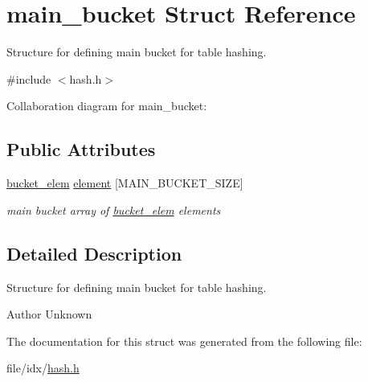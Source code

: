 \hypertarget{structmain__bucket}{\section{main\+\_\+bucket Struct Reference}
\label{structmain__bucket}
}


Structure for defining main bucket for table hashing.  




{\ttfamily \#include $<$hash.\+h$>$}



Collaboration diagram for main\+\_\+bucket\+:
\subsection*{Public Attributes}
\begin{DoxyCompactItemize}
\item 
\hypertarget{structmain__bucket_a9b8d4d8df358bb72c94902a6536a44aa}{\hyperlink{structbucket__elem}{bucket\+\_\+elem} \hyperlink{structmain__bucket_a9b8d4d8df358bb72c94902a6536a44aa}{element} \mbox{[}M\+A\+I\+N\+\_\+\+B\+U\+C\+K\+E\+T\+\_\+\+S\+I\+Z\+E\mbox{]}}\label{structmain__bucket_a9b8d4d8df358bb72c94902a6536a44aa}

\begin{DoxyCompactList}\small\item\em main bucket array of \hyperlink{structbucket__elem}{bucket\+\_\+elem} elements \end{DoxyCompactList}\end{DoxyCompactItemize}


\subsection{Detailed Description}
Structure for defining main bucket for table hashing. 

\begin{DoxyAuthor}{Author}
Unknown 
\end{DoxyAuthor}


The documentation for this struct was generated from the following file\+:\begin{DoxyCompactItemize}
\item 
file/idx/\hyperlink{hash_8h}{hash.\+h}\end{DoxyCompactItemize}
